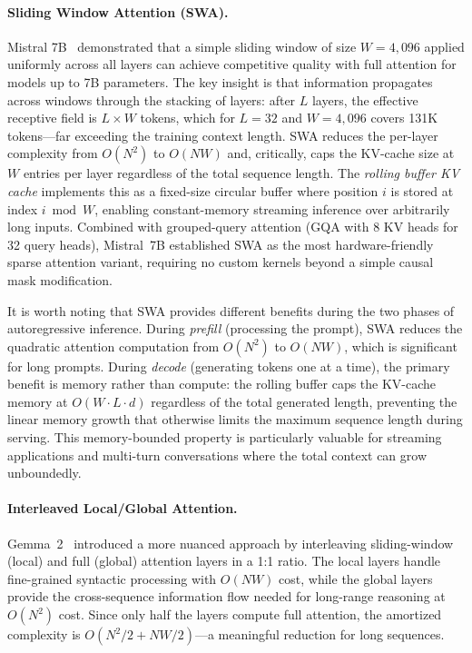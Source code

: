 \paragraph{Sliding Window Attention (SWA).}
Mistral 7B~\cite{jiang2023mistral} demonstrated that a simple sliding window of size $W = 4{,}096$ applied uniformly across all layers can achieve competitive quality with full attention for models up to 7B parameters. The key insight is that information propagates across windows through the stacking of layers: after $L$ layers, the effective receptive field is $L \times W$ tokens, which for $L = 32$ and $W = 4{,}096$ covers 131K tokens---far exceeding the training context length. SWA reduces the per-layer complexity from $O(N^2)$ to $O(NW)$ and, critically, caps the KV-cache size at $W$ entries per layer regardless of the total sequence length. The \emph{rolling buffer KV cache} implements this as a fixed-size circular buffer where position $i$ is stored at index $i \bmod W$, enabling constant-memory streaming inference over arbitrarily long inputs. Combined with grouped-query attention (GQA with 8 KV heads for 32 query heads),
Mistral~7B established SWA as the most hardware-friendly sparse attention variant,
requiring no custom kernels beyond a simple causal mask modification.

It is worth noting that SWA provides different benefits during the two phases of
autoregressive inference.
During \emph{prefill} (processing the prompt), SWA reduces the quadratic attention
computation from $O(N^2)$ to $O(NW)$, which is significant for long prompts.
During \emph{decode} (generating tokens one at a time), the primary benefit is memory
rather than compute: the rolling buffer caps the KV-cache memory at $O(W \cdot L \cdot d)$
regardless of the total generated length, preventing the linear memory growth that
otherwise limits the maximum sequence length during serving.
This memory-bounded property is particularly valuable for streaming applications and
multi-turn conversations where the total context can grow unboundedly.

\paragraph{Interleaved Local/Global Attention.}
Gemma~2~\cite{gemma2024improving} introduced a more nuanced approach by interleaving sliding-window (local) and full (global) attention layers in a 1:1 ratio. The local layers handle fine-grained syntactic processing with $O(NW)$ cost, while the global layers provide the cross-sequence information flow needed for long-range reasoning at $O(N^2)$ cost. Since only half the layers compute full attention, the amortized complexity is $O(N^2/2 + NW/2)$---a meaningful reduction for long sequences.

